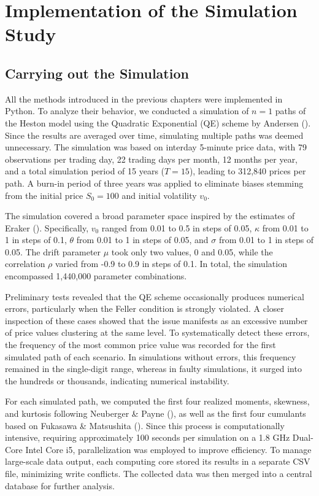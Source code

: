 \chapter{Implementation of the Simulation Study}
\label{sec:methodical_approach}

\section{Carrying out the Simulation}
All the methods introduced in the previous chapters were implemented in Python. To analyze their behavior, we conducted a simulation of $n = 1$ paths of the Heston model using the Quadratic Exponential (QE) scheme by Andersen (\citeyear{andersenEfficientSimulationHeston2007}). Since the results are averaged over time, simulating multiple paths was deemed unnecessary. The simulation was based on interday 5-minute price data, with 79 observations per trading day, 22 trading days per month, 12 months per year, and a total simulation period of 15 years ($T = 15$), leading to 312,840 prices per path. A burn-in period of three years was applied to eliminate biases stemming from the initial price $S_0 = 100$ and initial volatility $v_0$.

The simulation covered a broad parameter space inspired by the estimates of Eraker (\citeyear{erakerStockPricesVolatility2004}). Specifically, $v_0$ ranged from 0.01 to 0.5 in steps of 0.05, $\kappa$ from 0.01 to 1 in steps of 0.1, $\theta$ from 0.01 to 1 in steps of 0.05, and $\sigma$ from 0.01 to 1 in steps of 0.05. The drift parameter $\mu$ took only two values, 0 and 0.05, while the correlation $\rho$ varied from -0.9 to 0.9 in steps of 0.1. In total, the simulation encompassed 1,440,000 parameter combinations.

Preliminary tests revealed that the QE scheme occasionally produces numerical errors, particularly when the Feller condition is strongly violated. A closer inspection of these cases showed that the issue manifests as an excessive number of price values clustering at the same level. To systematically detect these errors, the frequency of the most common price value was recorded for the first simulated path of each scenario. In simulations without errors, this frequency remained in the single-digit range, whereas in faulty simulations, it surged into the hundreds or thousands, indicating numerical instability.

For each simulated path, we computed the first four realized moments, skewness, and kurtosis following Neuberger \& Payne (\citeyear{neubergerSkewnessStockMarket2021}), as well as the first four cumulants based on Fukasawa \& Matsushita (\citeyear{fukasawaRealizedCumulantsMartingales2021}). Since this process is computationally intensive, requiring approximately 100 seconds per simulation on a 1.8 GHz Dual-Core Intel Core i5, parallelization was employed to improve efficiency. To manage large-scale data output, each computing core stored its results in a separate CSV file, minimizing write conflicts. The collected data was then merged into a central database for further analysis.

